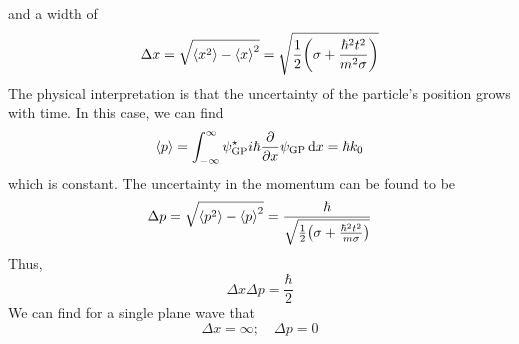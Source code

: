 and a width of
\[ \Delta x = \sqrt{\left\langle{x^2}\right\rangle - \left\langle{x}\right\rangle^2} = \sqrt{\frac{1}{2} \qty(\sigma + \frac{\hbar^2 t^2}{m^2 \sigma})} \]
The physical interpretation is that the uncertainty of the particle's position grows with time.
In this case, we can find
\[ \left\langle{p}\right\rangle = \int_{-\infty}^\infty \psi_{\text{GP}}^\star i \hbar \pdv{x} \psi_{\text{GP}} \dd{x} = \hbar k_0 \]
which is constant.
The uncertainty in the momentum can be found to be
\[ \Delta p = \sqrt{\left\langle{p^2}\right\rangle - \left\langle{p}\right\rangle^2} = \frac{\hbar}{\sqrt{\frac{1}{2} \qty(\sigma + \frac{\hbar^2 t^2}{m \sigma})}} \]
Thus,
\[ \Delta x \Delta p = \frac{\hbar}{2} \]
We can find for a single plane wave that
\[ \Delta x = \infty;\quad \Delta p = 0 \]
